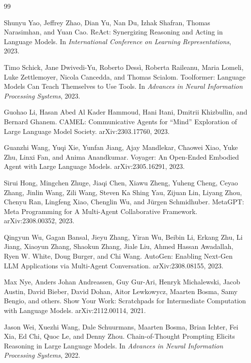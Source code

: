 \documentclass{article}
\begin{document}
\begin{thebibliography}{99}

Shunyu Yao, Jeffrey Zhao, Dian Yu, Nan Du, Izhak Shafran, Thomas Narasimhan, and Yuan Cao.
\newblock ReAct: Synergizing Reasoning and Acting in Language Models.
\newblock In \emph{International Conference on Learning Representations}, 2023.

Timo Schick, Jane Dwivedi-Yu, Roberto Dess\`i, Roberta Raileanu, Maria Lomeli, Luke Zettlemoyer, Nicola Cancedda, and Thomas Scialom.
\newblock Toolformer: Language Models Can Teach Themselves to Use Tools.
\newblock In \emph{Advances in Neural Information Processing Systems}, 2023.

Guohao Li, Hasan Abed Al Kader Hammoud, Hani Itani, Dmitrii Khizbullin, and Bernard Ghanem.
\newblock CAMEL: Communicative Agents for ``Mind'' Exploration of Large Language Model Society.
\newblock arXiv:2303.17760, 2023.

Guanzhi Wang, Yuqi Xie, Yunfan Jiang, Ajay Mandlekar, Chaowei Xiao, Yuke Zhu, Linxi Fan, and Anima Anandkumar.
\newblock Voyager: An Open-Ended Embodied Agent with Large Language Models.
\newblock arXiv:2305.16291, 2023.

Sirui Hong, Mingchen Zhuge, Jiaqi Chen, Xiawu Zheng, Yuheng Cheng, Ceyao Zhang, Jinlin Wang, Zili Wang, Steven Ka Shing Yau, Zijuan Lin, Liyang Zhou, Chenyu Ran, Lingfeng Xiao, Chenglin Wu, and J\"urgen Schmidhuber.
\newblock MetaGPT: Meta Programming for A Multi-Agent Collaborative Framework.
\newblock arXiv:2308.00352, 2023.

Qingyun Wu, Gagan Bansal, Jieyu Zhang, Yiran Wu, Beibin Li, Erkang Zhu, Li Jiang, Xiaoyun Zhang, Shaokun Zhang, Jiale Liu, Ahmed Hassan Awadallah, Ryen W. White, Doug Burger, and Chi Wang.
\newblock AutoGen: Enabling Next-Gen LLM Applications via Multi-Agent Conversation.
\newblock arXiv:2308.08155, 2023.

Max Nye, Anders Johan Andreassen, Guy Gur-Ari, Henryk Michalewski, Jacob Austin, David Bieber, David Dohan, Aitor Lewkowycz, Maarten Bosma, Samy Bengio, and others.
\newblock Show Your Work: Scratchpads for Intermediate Computation with Language Models.
\newblock arXiv:2112.00114, 2021.

Jason Wei, Xuezhi Wang, Dale Schuurmans, Maarten Bosma, Brian Ichter, Fei Xia, Ed Chi, Quoc Le, and Denny Zhou.
\newblock Chain-of-Thought Prompting Elicits Reasoning in Large Language Models.
\newblock In \emph{Advances in Neural Information Processing Systems}, 2022.


\end{thebibliography}
\end{document}

